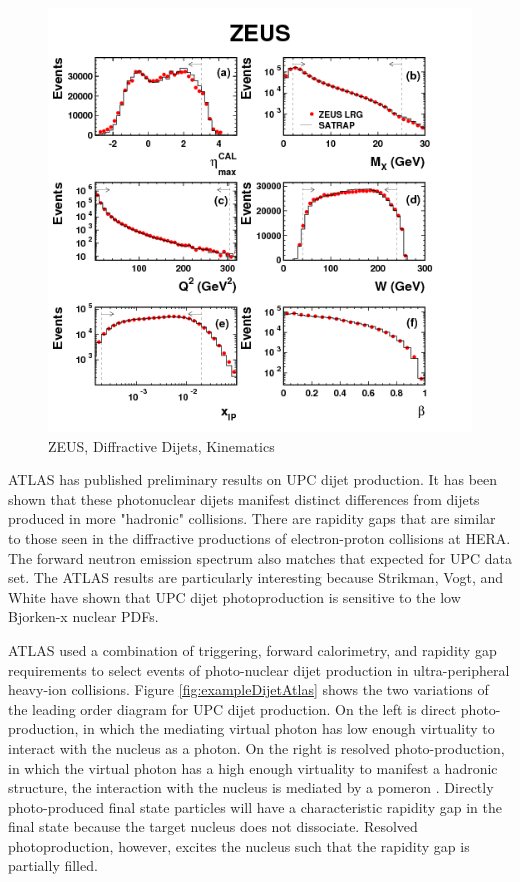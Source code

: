 \begin{figure}[h!]
\begin{centering}
\includegraphics[width=6in]{Chapter2/importfigs/DESY-08-175_2.png}
\par\end{centering}
\caption{ZEUS, Diffractive Dijets, Kinematics \cite{Chekanov:2008fh} \label{fig:zeusKinematics}}
\end{figure}

ATLAS has published preliminary results on UPC dijet production. It has been shown that these photonuclear dijets manifest distinct differences from dijets produced in more "hadronic" collisions. There are rapidity gaps that are similar to those seen in the diffractive productions of electron-proton collisions at HERA. The forward neutron emission spectrum also matches that expected for UPC data set. The ATLAS results are particularly interesting because Strikman, Vogt, and White have shown that UPC dijet photoproduction is sensitive to the low Bjorken-x nuclear PDFs.

ATLAS used a combination of triggering, forward calorimetry, and rapidity gap requirements to select events of photo-nuclear dijet production in ultra-peripheral heavy-ion collisions. Figure \ref{fig:exampleDijetAtlas} shows the two variations of the leading order diagram for UPC dijet production. On the left is direct photo-production, in which the mediating virtual photon has low enough virtuality to interact with the nucleus as a photon. On the right is resolved photo-production, in which the virtual photon has a high enough virtuality to manifest a hadronic structure, the interaction with the nucleus is mediated by a pomeron \cite{Donnachie:2002en}. Directly photo-produced final state particles will have a characteristic rapidity gap in the final state because the target nucleus does not dissociate. Resolved photoproduction, however, excites the nucleus such that the rapidity gap is partially filled. 

